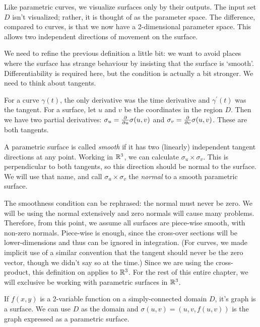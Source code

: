 \documentclass[fleqn,letterpaper]{report}
\begin{document}
Like parametric curves, we visualize surfaces only by their
outputs. The input set $D$ isn't visualized; rather, it is
thought of as the parameter space. The difference, compared to
curves, is that we now have a 2-dimensional parameter space.
This allows two independent directions of movement on the
surface.

We need to refine the previous definition a little bit: we
want to avoid places where the surface has strange behaviour
by insisting that the surface is `smooth'. Differentiability
is required here, but the condition is actually a bit
stronger. We need to think about tangents. 

For a curve $\gamma(t)$, the only derivative was the time
derivative and $\gamma^\prime(t)$ was the tangent. For a
surface, let $u$ and $v$ be the coordinates in the region $D$.
Then we have two partial derivatives: $\sigma_u =
\frac{\partial}{\partial u} \sigma(u,v)$ and $\sigma_v =
\frac{\partial}{\partial v} \sigma (u,v)$. These are both tangents. 

\begin{defn}
A parametric surface is called \emph{smooth} if it has two (linearly)
independent tangent directions at any point.
Working in $\mathbb{R}^3$, we can calculate $\sigma_u \times
\sigma_v$. This is perpendicular to both tangents, so this
direction should be normal to the surface. We will
use that name, and call $\sigma_u \times \sigma_v$ the
\emph{normal} to a smooth parametric surface. 
\end{defn}

The smoothness condition can be rephrased: the normal must never
be zero. We will be using the normal extensively and
zero normals will cause many problems. Therefore, from this
point, we assume all surfaces are piece-wise smooth, with non-zero
normals. Piece-wise is enough, since the cross-over sections
will be lower-dimensions and thus can be ignored in
integration. (For curves, we made implicit use of a similar
convention that the tangent should never be the zero vector,
though we didn't say so at the time.) Since we are using the
cross-product, this definition on applies to $\mathbb{R}^3$. For the
rest of this entire chapter, we will exclusive be working with
parametric surfaces in $\mathbb{R}^3$.

\begin{example}
\label{example-surface-graph}
If $f(x,y)$ is a 2-variable function on a
simply-connected domain $D$, it's graph is a surface. We can
use $D$ as the domain and $\sigma (u,v) = (u,v,f(u,v))$
is the graph expressed as a parametric surface.
\end{example}
\end{document}
